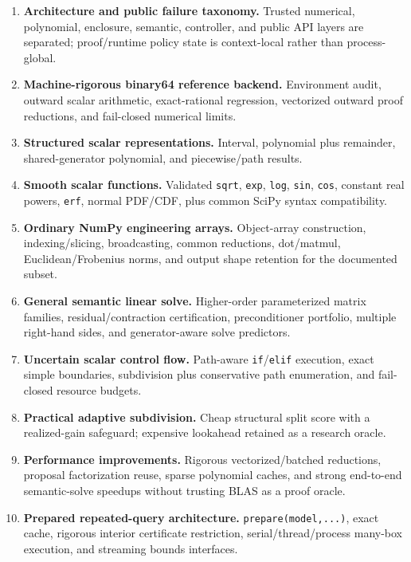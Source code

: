 \documentclass[11pt]{article}
\begin{document}
\begin{enumerate}[leftmargin=*]
\item \textbf{Architecture and public failure taxonomy.}  Trusted numerical,
polynomial, enclosure, semantic, controller, and public API layers are separated;
proof/runtime policy state is context-local rather than process-global.
\item \textbf{Machine-rigorous binary64 reference backend.}  Environment audit,
outward scalar arithmetic, exact-rational regression, vectorized outward proof
reductions, and fail-closed numerical limits.
\item \textbf{Structured scalar representations.}  Interval, polynomial plus
remainder, shared-generator polynomial, and piecewise/path results.
\item \textbf{Smooth scalar functions.}  Validated \texttt{sqrt}, \texttt{exp},
\texttt{log}, \texttt{sin}, \texttt{cos}, constant real powers,
\texttt{erf}, normal PDF/CDF, plus common SciPy syntax compatibility.
\item \textbf{Ordinary NumPy engineering arrays.}  Object-array construction,
indexing/slicing, broadcasting, common reductions, dot/matmul, Euclidean/Frobenius
norms, and output shape retention for the documented subset.
\item \textbf{General semantic linear solve.}  Higher-order parameterized matrix
families, residual/contraction certification, preconditioner portfolio, multiple
right-hand sides, and generator-aware solve predictors.
\item \textbf{Uncertain scalar control flow.}  Path-aware \texttt{if}/\texttt{elif}
execution, exact simple boundaries, subdivision plus conservative path enumeration,
and fail-closed resource budgets.
\item \textbf{Practical adaptive subdivision.}  Cheap structural split score with
a realized-gain safeguard; expensive lookahead retained as a research oracle.
\item \textbf{Performance improvements.}  Rigorous vectorized/batched reductions,
proposal factorization reuse, sparse polynomial caches, and strong end-to-end
semantic-solve speedups without trusting BLAS as a proof oracle.
\item \textbf{Prepared repeated-query architecture.}  \texttt{prepare(model,...)},
exact cache, rigorous interior certificate restriction, serial/thread/process
many-box execution, and streaming bounds interfaces.
\end{enumerate}
\end{document}
